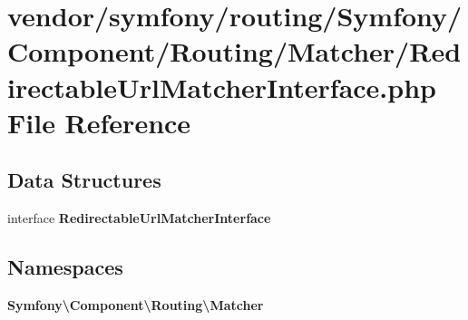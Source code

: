 \section{vendor/symfony/routing/\+Symfony/\+Component/\+Routing/\+Matcher/\+Redirectable\+Url\+Matcher\+Interface.php File Reference}
\label{_redirectable_url_matcher_interface_8php}
\subsection*{Data Structures}
\begin{DoxyCompactItemize}
\item 
interface {\bf Redirectable\+Url\+Matcher\+Interface}
\end{DoxyCompactItemize}
\subsection*{Namespaces}
\begin{DoxyCompactItemize}
\item 
 {\bf Symfony\textbackslash{}\+Component\textbackslash{}\+Routing\textbackslash{}\+Matcher}
\end{DoxyCompactItemize}
